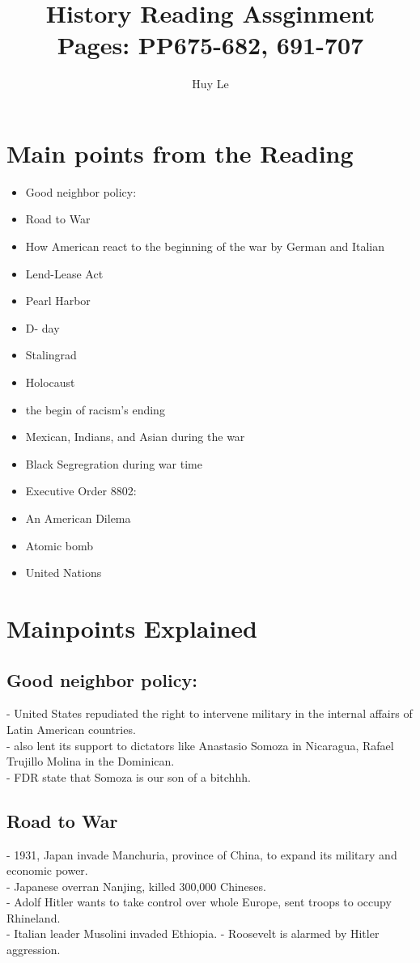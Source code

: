 \documentclass{article}
\begin{document}
\title{History Reading Assginment Pages:  PP675-682, 691-707}
\author{Huy Le}
\maketitle
\section{Main points from the Reading}
\begin{itemize}
\item Good neighbor policy:
\item Road to War
\item How American react to the beginning of the war by German and Italian
\item Lend-Lease Act
\item Pearl Harbor
\item D- day
\item Stalingrad
\item Holocaust
\item the begin of racism's ending
\item Mexican, Indians, and Asian during the war
\item Black Segregration during war time
\item Executive Order 8802:
\item An American Dilema
\item Atomic bomb
\item United Nations
\end{itemize}

\section{Mainpoints Explained}
\subsection{Good neighbor policy:}
- United States repudiated the right to intervene military in the internal affairs of Latin American countries.\\
- also lent its support to dictators like Anastasio Somoza in Nicaragua, Rafael Trujillo Molina in the Dominican. \\
- FDR state that Somoza is our son of a bitchhh.\\

\subsection{ Road to War}
- 1931, Japan invade Manchuria, province of China, to expand its military and economic power.\\
- Japanese overran Nanjing, killed 300,000 Chineses.\\
- Adolf Hitler wants to take control over whole Europe, sent troops to occupy Rhineland.\\
- Italian leader Musolini invaded Ethiopia. 
- Roosevelt is alarmed by Hitler aggression.
\end{document}
